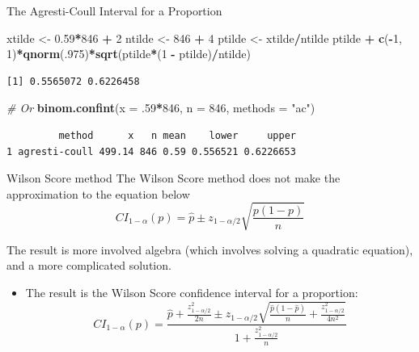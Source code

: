 \documentclass[
  ignorenonframetext,
]{beamer}
\newenvironment{Shaded}{\begin{snugshade}}{\end{snugshade}}
\newcommand{\AttributeTok}[1]{\textcolor[rgb]{0.13,0.29,0.53}{#1}}
\newcommand{\CommentTok}[1]{\textcolor[rgb]{0.56,0.35,0.01}{\textit{#1}}}
\newcommand{\DecValTok}[1]{\textcolor[rgb]{0.00,0.00,0.81}{#1}}
\newcommand{\FloatTok}[1]{\textcolor[rgb]{0.00,0.00,0.81}{#1}}
\newcommand{\FunctionTok}[1]{\textcolor[rgb]{0.13,0.29,0.53}{\textbf{#1}}}
\newcommand{\NormalTok}[1]{#1}
\newcommand{\OtherTok}[1]{\textcolor[rgb]{0.56,0.35,0.01}{#1}}
\newcommand{\SpecialCharTok}[1]{\textcolor[rgb]{0.81,0.36,0.00}{\textbf{#1}}}
\newcommand{\StringTok}[1]{\textcolor[rgb]{0.31,0.60,0.02}{#1}}
\providecommand{\tightlist}{%
  \setlength{\itemsep}{0pt}\setlength{\parskip}{0pt}}
\begin{document}
\begin{frame}[fragile]{The Agresti-Coull Interval for a Proportion}
\protect\hypertarget{the-agresti-coull-interval-for-a-proportion-2}{}
\small

\begin{Shaded}
\begin{Highlighting}[]
\NormalTok{xtilde }\OtherTok{\textless{}{-}} \FloatTok{0.59}\SpecialCharTok{*}\DecValTok{846} \SpecialCharTok{+} \DecValTok{2}
\NormalTok{ntilde }\OtherTok{\textless{}{-}} \DecValTok{846} \SpecialCharTok{+} \DecValTok{4}
\NormalTok{ptilde }\OtherTok{\textless{}{-}}\NormalTok{ xtilde}\SpecialCharTok{/}\NormalTok{ntilde}
\NormalTok{ptilde }\SpecialCharTok{+} \FunctionTok{c}\NormalTok{(}\SpecialCharTok{{-}}\DecValTok{1}\NormalTok{, }\DecValTok{1}\NormalTok{)}\SpecialCharTok{*}\FunctionTok{qnorm}\NormalTok{(.}\DecValTok{975}\NormalTok{)}\SpecialCharTok{*}\FunctionTok{sqrt}\NormalTok{(ptilde}\SpecialCharTok{*}\NormalTok{(}\DecValTok{1} \SpecialCharTok{{-}}\NormalTok{ ptilde)}\SpecialCharTok{/}\NormalTok{ntilde)}
\end{Highlighting}
\end{Shaded}

\begin{verbatim}
[1] 0.5565072 0.6226458
\end{verbatim}

\begin{Shaded}
\begin{Highlighting}[]
\CommentTok{\# Or}
\FunctionTok{binom.confint}\NormalTok{(}\AttributeTok{x =}\NormalTok{ .}\DecValTok{59}\SpecialCharTok{*}\DecValTok{846}\NormalTok{, }\AttributeTok{n =} \DecValTok{846}\NormalTok{, }\AttributeTok{methods =} \StringTok{"ac"}\NormalTok{)}
\end{Highlighting}
\end{Shaded}

\begin{verbatim}
         method      x   n mean    lower     upper
1 agresti-coull 499.14 846 0.59 0.556521 0.6226653
\end{verbatim}

\normalsize
\end{frame}

\begin{frame}{Wilson Score method}
\protect\hypertarget{wilson-score-method}{}
The Wilson Score method does not make the approximation to the equation
below
\[CI_{1 - \alpha}(p)=\hat{p}\pm z_{1-\alpha/2}\sqrt{\frac{p(1-p)}{n}}\]

The result is more involved algebra (which involves solving a quadratic
equation), and a more complicated solution.

\begin{itemize}
\tightlist
\item
  The result is the Wilson Score confidence interval for a proportion:
  \[CI_{1-\alpha}(p)=\frac{\hat{p}+\frac{z^2_{1-\alpha/2}}{2n}\pm z_{1-\alpha/2}\sqrt{\frac{\hat{p}(1-\hat{p})}{n}+\frac{z^2_{1-\alpha/2}}{4n^2}}}{1+\frac{z^2_{1-\alpha/2}}{n}}\]
\end{itemize}
\end{frame}
\end{document}
